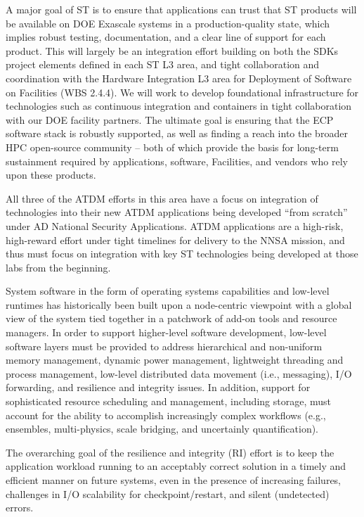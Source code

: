 A major goal of ST is to ensure that applications can trust that ST products will be available on DOE Exascale systems in a production-quality state, which implies robust testing, documentation, and a clear line of support for each product. This will largely be an integration effort building on both the SDKs project elements defined in each ST L3 area, and tight collaboration and coordination with the Hardware Integration L3 area for Deployment of Software on Facilities (WBS 2.4.4). We will work to develop foundational infrastructure for technologies such as continuous integration and containers in tight collaboration with our DOE facility partners. The ultimate goal is ensuring that the ECP software stack is robustly supported, as well as finding a reach into the broader HPC open-source community – both of which provide the basis for long-term sustainment required by applications, software, Facilities, and vendors who rely upon these products.

All three of the ATDM efforts in this area have a focus on integration of technologies into their new ATDM applications being developed “from scratch” under AD National Security Applications. ATDM applications are a high-risk, high-reward effort under tight timelines for delivery to the NNSA mission, and thus must focus on integration with key ST technologies being developed at those labs from the beginning. 

System software in the form of operating systems capabilities and low-level runtimes has historically been built upon a node-centric viewpoint with a global view of the system tied together in a patchwork of add-on tools and resource managers. In order to support higher-level software development, low-level software layers must be provided to address hierarchical and non-uniform memory management, dynamic power management, lightweight threading and process management, low-level distributed data movement (i.e., messaging), I/O forwarding, and resilience and integrity issues. In addition, support for sophisticated resource scheduling and management, including storage, must account for the ability to accomplish increasingly complex workflows (e.g., ensembles, multi-physics, scale bridging, and uncertainly quantification). 

The overarching goal of the resilience and integrity (RI) effort is to keep the application workload running to an acceptably correct solution in a timely and efficient manner on future systems, even in the presence of increasing failures, challenges in I/O scalability for checkpoint/restart, and silent (undetected) errors.

